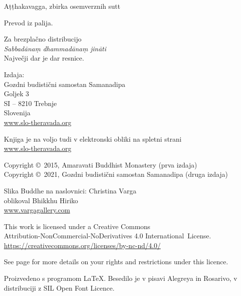 \cleartoverso

\thispagestyle{empty}

{\smaller\setlength{\parskip}{0.5em}\setlength{\parindent}{0em}%
{\raggedright

Aṭṭhakavagga, zbirka osemverznih sutt

Prevod iz palija.

Za brezplačno distribucijo\\
\emph{Sabbadānaṃ dhammadānaṃ jināti}\\
Največji dar je dar resnice.

Izdaja:\\
Gozdni budistični samostan Samanadipa\\
Goljek 3\\
SI -- 8210 Trebnje\\
Slovenija\\
\href{http://www.slo-theravada.org}{www.slo-theravada.org}

Knjiga je na voljo tudi v elektronski obliki na spletni strani\\
\href{https://slo-theravada.org}{www.slo-theravada.org}

Copyright \copyright\ 2015, Amaravati Buddhist Monastery (prva izdaja)\\
Copyright \copyright\ 2021, Gozdni budistični samostan Samanadipa (druga izdaja)

Slika Buddhe na naslovnici: Christina Varga\\
oblikoval Bhikkhu Hiriko\\
\href{http://vargagallery.com}{www.vargagallery.com}

\vfill

This work is licensed under a Creative Commons\\
Attribution-NonCommercial-NoDerivatives 4.0 International~License.\\
\href{https://creativecommons.org/licenses/by-nc-nd/4.0/}{https://creativecommons.org/licenses/by-nc-nd/4.0/}

See page \pageref{copyright-details} for more details on your rights and restrictions under this licence.

Proizvedeno s programom \LaTeX. Besedilo je v pisavi Alegreya in Rosarivo, v distribuciji z SIL Open Font Licence.

\theEditionInfo

}}


